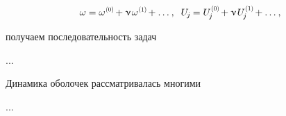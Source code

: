 \begin{otherlanguage}{russian}
\nopagebreak\vspace{-0.2em}\begin{equation*}
\omega = \omega^{\hspace{.1ex}\scalebox{0.66}[0.66]{(0)}} \hspace{-0.25ex} + \smallparameter \hspace{.2ex} \omega^{\hspace{.1ex}\scalebox{0.66}[0.66]{(1)}} \hspace{-0.25ex} + \ldots \hspace{.1ex} ,
\;\;
U_{\hspace{-0.2ex}j} \hspace{-0.15ex} = U_{\hspace{-0.2ex}j}^{\hspace{.1ex}\scalebox{0.66}[0.66]{(0)}} \hspace{-0.25ex} + \smallparameter \hspace{.2ex} U_{\hspace{-0.2ex}j}^{\hspace{.1ex}\scalebox{0.66}[0.66]{(1)}} \hspace{-0.25ex} + \ldots \hspace{.1ex} ,
\end{equation*}

\vspace{-0.25em} \noindent получаем последовательность задач

...




\end{otherlanguage}



\begin{otherlanguage}{russian}

Динамика оболочек рассматривалась многими

...




\end{otherlanguage}



